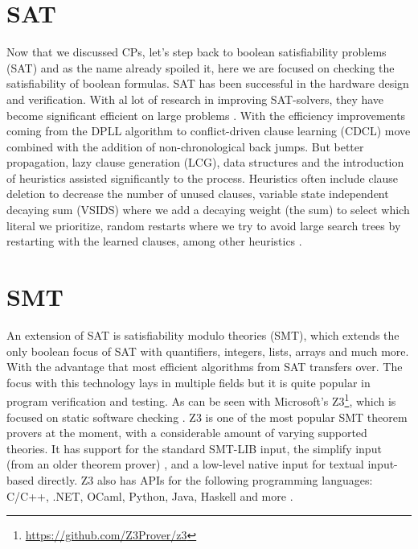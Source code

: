 \section{SAT}
\label{CS:SAT}
Now that we discussed CPs, let's step back to boolean satisfiability problems (SAT) and as the name already spoiled it, here we are focused on checking the satisfiability of boolean formulas. SAT has been successful in the hardware design and verification. With al lot of research in improving SAT-solvers, they have become significant efficient on large problems \cite{56bardin2019bringing}.
With the efficiency improvements coming from the DPLL algorithm to conflict-driven clause learning (CDCL) move combined with the addition of non-chronological back jumps. But better propagation, lazy clause generation (LCG), data structures and the introduction of heuristics assisted significantly to the process. Heuristics often include clause deletion to decrease the number of unused clauses, variable state independent decaying sum (VSIDS) where we add a decaying weight (the sum) to select which literal we prioritize, random restarts where we try to avoid large search trees by restarting with the learned clauses, among other heuristics \cite{61MCSMarcDenecker, 60katebi2011empirical, 67stuckey2010lazyClauseGeneration}.



\section{SMT}
\label{CS:SMT}
An extension of SAT is satisfiability modulo theories (SMT), which extends the only boolean focus of SAT with quantifiers, integers, lists, arrays and much more. With the advantage that most efficient algorithms from SAT transfers over. The focus with this technology lays in multiple fields but it is quite popular in program verification and testing. As can be seen with Microsoft's Z3\footnote{\url{https://github.com/Z3Prover/z3}}, which is focused on static software checking \cite{54moura2008z3}. Z3 is one of the most popular SMT theorem provers at the moment, with a considerable amount of varying supported theories. It has support for the standard SMT-LIB input, the simplify input (from an older theorem prover) \cite{73detlefs2005simplify}, and a low-level native input for textual input-based directly. Z3 also has APIs for the following programming languages: C/C++, .NET, OCaml, Python, Java, Haskell and more \cite{64WikiSMT}.

